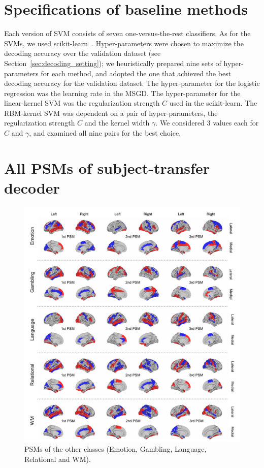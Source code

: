 \section{Specifications of baseline methods}
\label{sec:app_baseline_methods}
%
Each version of SVM consists of seven one-versus-the-rest classifiers.
%
As for the SVMs, we used scikit-learn~\cite{pedregosa2011scikit}.
Hyper-parameters were chosen to maximize the decoding accuracy over the validation dataset (see Section~\ref{sec:decoding_setting}); we heuristically prepared nine sets of hyper-parameters for each method, and adopted the one that achieved the best decoding accuracy for the validation dataset.
%
The hyper-parameter for the logistic regression was the learning rate in the MSGD.
%
The hyper-parameter for the linear-kernel SVM was the regularization strength $C$ used in the scikit-learn.
%
The RBM-kernel SVM was dependent on a pair of hyper-parameters, the regularization strength $C$ and the kernel width $\gamma$.
%
We considered $3$ values each for $C$ and $\gamma$, and examined all nine pairs for the best choice.

\clearpage
\section{All PSMs of subject-transfer decoder}
\label{sec:app_decoding}
%
\begin{figure}[htbp]
\label{fig:appendix_psa}
\begin{center}
\includegraphics[width=.90\columnwidth]{fig/psa_appendix.pdf}
\caption{PSMs of the other classes (Emotion, Gambling, Language,
 Relational and WM).}
\end{center}
\end{figure}
